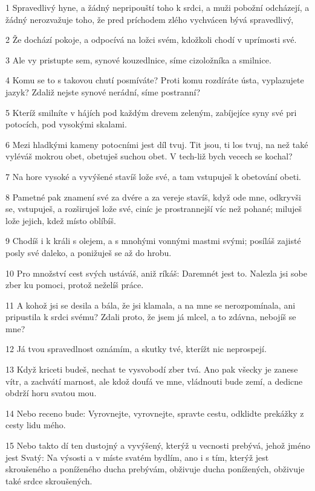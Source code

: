 \par 1 Spravedlivý hyne, a žádný nepripouští toho k srdci, a muži pobožní odcházejí, a žádný nerozvažuje toho, že pred príchodem zlého vychvácen bývá spravedlivý,
\par 2 Že dochází pokoje, a odpocívá na ložci svém, kdožkoli chodí v uprímosti své.
\par 3 Ale vy pristupte sem, synové kouzedlnice, síme cizoložníka a smilnice.
\par 4 Komu se to s takovou chutí posmíváte? Proti komu rozdíráte ústa, vyplazujete jazyk? Zdaliž nejste synové nerádní, síme postranní?
\par 5 Kteríž smilníte v hájích pod každým drevem zeleným, zabíjejíce syny své pri potocích, pod vysokými skalami.
\par 6 Mezi hladkými kameny potocními jest díl tvuj. Tit jsou, ti los tvuj, na než také vyléváš mokrou obet, obetuješ suchou obet. V tech-liž bych vecech se kochal?
\par 7 Na hore vysoké a vyvýšené stavíš lože své, a tam vstupuješ k obetování obeti.
\par 8 Pametné pak znamení své za dvére a za vereje stavíš, když ode mne, odkryvši se, vstupuješ, a rozširuješ lože své, ciníc je prostrannejší víc než pohané; miluješ lože jejich, kdež místo oblíbíš.
\par 9 Chodíš i k králi s olejem, a s mnohými vonnými mastmi svými; posíláš zajisté posly své daleko, a ponižuješ se až do hrobu.
\par 10 Pro množství cest svých ustáváš, aniž ríkáš: Daremnét jest to. Nalezla jsi sobe zber ku pomoci, protož neželíš práce.
\par 11 A kohož jsi se desila a bála, že jsi klamala, a na mne se nerozpomínala, ani pripustila k srdci svému? Zdali proto, že jsem já mlcel, a to zdávna, nebojíš se mne?
\par 12 Já tvou spravedlnost oznámím, a skutky tvé, kterížt nic neprospejí.
\par 13 Když kriceti budeš, nechat te vysvobodí zber tvá. Ano pak všecky je zanese vítr, a zachvátí marnost, ale kdož doufá ve mne, vládnouti bude zemí, a dedicne obdrží horu svatou mou.
\par 14 Nebo receno bude: Vyrovnejte, vyrovnejte, spravte cestu, odklidte prekážky z cesty lidu mého.
\par 15 Nebo takto dí ten dustojný a vyvýšený, kterýž u vecnosti prebývá, jehož jméno jest Svatý: Na výsosti a v míste svatém bydlím, ano i s tím, kterýž jest skroušeného a poníženého ducha prebývám, obživuje ducha ponížených, obživuje také srdce skroušených.
